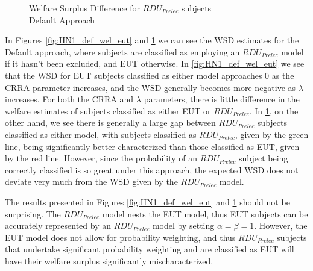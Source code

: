 \documentclass[../main.tex]{subfiles}
\begin{document}
\begin{figure}[h!]
	\center
	\caption{Welfare Surplus Difference for $\mathit{RDU_{Prelec}}$ subjects\\Default Approach}
	\label{fig:HN1_def_wel_pre}
\end{figure}

In Figures \ref{fig:HN1_def_wel_eut} and \ref{fig:HN1_def_wel_pre} we can see the WSD estimates for the Default approach, where subjects are classified as employing an $\mathit{RDU_{Prelec}}$ model if it hasn't been excluded, and EUT otherwise.
In \ref{fig:HN1_def_wel_eut} we see that the WSD for EUT subjects classified as either model approaches 0 as the CRRA parameter increases, and the WSD generally becomes more negative as $\lambda$ increases.
For both the CRRA and $\lambda$ parameters, there is little difference in the welfare estimates of subjects classified as either EUT or $\mathit{RDU_{Prelec}}$.
In \ref{fig:HN1_def_wel_pre}, on the other hand, we see there is generally a large gap between $\mathit{RDU_{Prelec}}$ subjects classified as either model, with subjects classified as $\mathit{RDU_{Prelec}}$, given by the green line, being significantly better characterized than those classified as EUT, given by the red line.
However, since the probability of an $\mathit{RDU_{Prelec}}$ subject being correctly classified is so great under this approach, the expected WSD does not deviate very much from the WSD given by the $\mathit{RDU_{Prelec}}$ model.

The results presented in Figures \ref{fig:HN1_def_wel_eut} and \ref{fig:HN1_def_wel_pre} should not be surprising.
The $\mathit{RDU_{Prelec}}$ model nests the EUT model, thus EUT subjects can be accurately represented by an $\mathit{RDU_{Prelec}}$ model by setting $\alpha = \beta = 1$.
However, the EUT model does not allow for probability weighting, and thus $\mathit{RDU_{Prelec}}$ subjects that undertake significant probability weighting and are classified as EUT will have their welfare surplus significantly mischaracterized.
\end{document}
